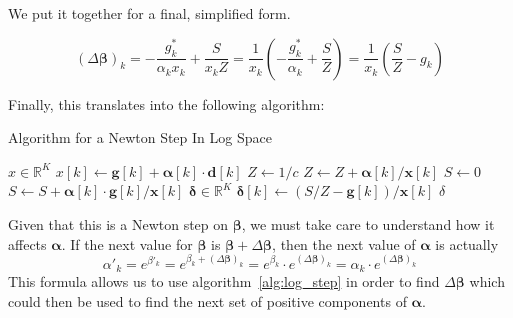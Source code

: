 \documentclass[twoside]{article}
\begin{document}
We put it together for a final, simplified form.

\[
\left({\Delta \boldsymbol{\beta}}\right)_k = - \frac{{g}^*_k}{{\alpha}_k{x}_k} + \frac{S}{{x}_k Z} = \frac{1}{{x}_k}\left(- \frac{{g}^*_k}{{\alpha}_k} + \frac{S}{Z}\right)= \frac{1}{{x}_k}\left(\frac{S}{Z} - {g}_k\right)
\]

Finally, this translates into the following algorithm:

\begin{algorithm}
  \caption{Algorithm for a Newton Step In Log Space}
  \begin{algorithmic}
  \State $x \in \mathbb{R}^{K}$
    \State $x[k] \gets \mathbf{g}[k]+\mathbf{\alpha}[k] \cdot \mathbf{d}[k]$
  \EndFor
  \State $Z \gets 1/c$
    \State $Z \gets Z + \mathbf{\alpha}[k] / \mathbf{x}[k]$
  \EndFor
  \State $S \gets 0$
    \State $S \gets S + \mathbf{\alpha}[k] \cdot \mathbf{g}[k]/\mathbf{x}[k]$
  \EndFor
  \State $\mathbf{\delta} \in \mathbb{R}^{K}$
    \State $\mathbf{\delta}[k] \gets (S / Z - \mathbf{g}[k]) / \mathbf{x}[k]$ \EndFor
  \State \Return $\delta$
  \EndFunction
  \end{algorithmic}
  \label{alg:log_step}
\end{algorithm}

Given that this is a Newton step on $\boldsymbol{\beta}$, we must take care to understand how it affects $\boldsymbol{\alpha}$. If the next value for $\boldsymbol{\beta}$ is $\boldsymbol{\beta} + \Delta \boldsymbol{\beta}$, then the next value of $\boldsymbol{\alpha}$ is actually
\[
{\alpha}'_k = e^{{\beta}'_k} = e^{{\beta}_k + \left(\Delta \boldsymbol{\beta}\right)_k} = e^{{\beta}_k} \cdot e^{\left(\Delta \boldsymbol{\beta}\right)_k} = {\alpha}_k \cdot e^{\left(\Delta \boldsymbol{\beta}\right)_k}  
\]
This formula allows us to use algorithm~\ref{alg:log_step} in order to find $\Delta \boldsymbol{\beta}$ which could then be used to find the next set of positive components of $\boldsymbol{\alpha}$.
\end{document}
